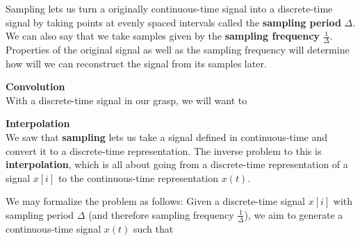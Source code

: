 Sampling lets us turn a originally continuous-time signal into a discrete-time signal by taking points at evenly spaced intervals called the \textbf{sampling period} $\Delta$. We can also say that we take samples given by the \textbf{sampling frequency} $\frac{1}{\Delta}$. Properties of the original signal as well as the sampling frequency will determine how will we can reconstruct the signal from its samples later.

\textbf{Convolution} \\
With a discrete-time signal in our grasp, we will want to 

\textbf{Interpolation} \\
We saw that \textbf{sampling} lets us take a signal defined in continuous-time and convert it to a discrete-time representation.
The inverse problem to this is \textbf{interpolation}, which is all about going from a discrete-time representation of a signal $x[i]$ to the continuous-time representation $x(t)$.

\begin{figure}[H]
\end{figure}

We may formalize the problem as follows: Given a discrete-time signal $x[i]$ with sampling period $\Delta$ (and therefore sampling frequency $\frac{1}{\Delta}$), we aim to generate a continuous-time signal $x(t)$ such that 

